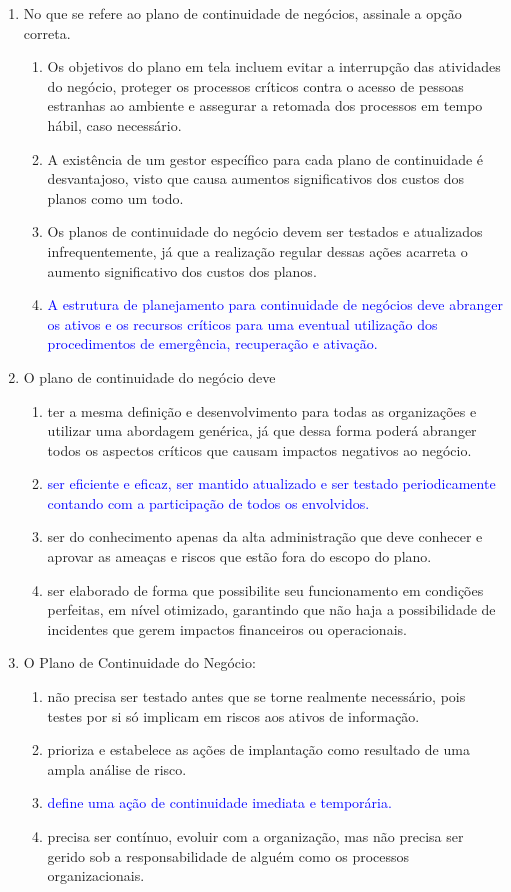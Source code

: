 \documentclass{report}
\begin{document}
\begin{enumerate}
		\item No que se refere ao plano de continuidade de negócios, assinale a opção correta.
		\begin{enumerate}[label=(\alph*)]
			\item Os objetivos do plano em tela incluem evitar a interrupção das atividades do negócio, proteger os processos críticos contra o acesso de pessoas estranhas ao ambiente e assegurar a retomada dos processos em tempo hábil, caso necessário.
			\item A existência de um gestor específico para cada plano de continuidade é desvantajoso, visto que causa aumentos significativos dos custos dos planos como um todo.
			\item Os planos de continuidade do negócio devem ser testados e atualizados infrequentemente, já que a realização regular dessas ações acarreta o aumento significativo dos custos dos planos.
			\item \textcolor{blue}{A estrutura de planejamento para continuidade de negócios deve abranger os ativos e os recursos críticos para uma eventual utilização dos procedimentos de emergência, recuperação e ativação.}
		\end{enumerate}
		
		\item O plano de continuidade do negócio deve
		\begin{enumerate}[label=(\alph*)]
			\item ter a mesma definição e desenvolvimento para todas as organizações e utilizar uma abordagem genérica, já que dessa forma poderá abranger todos os aspectos críticos que causam impactos negativos ao negócio.
			\item \textcolor{blue}{ser eficiente e eficaz, ser mantido atualizado e ser testado periodicamente contando com a participação de todos os envolvidos.}
			\item ser do conhecimento apenas da alta administração que deve conhecer e aprovar as ameaças e riscos que estão fora do escopo do plano.
			\item ser elaborado de forma que possibilite seu funcionamento em condições perfeitas, em nível otimizado, garantindo que não haja a possibilidade de incidentes que gerem impactos financeiros ou operacionais.
		\end{enumerate}
		
		\item O Plano de Continuidade do Negócio:
		\begin{enumerate}[label=(\alph*)]
			\item não precisa ser testado antes que se torne realmente necessário, pois testes por si só implicam em riscos aos ativos de informação.
			\item prioriza e estabelece as ações de implantação como resultado de uma ampla análise de risco.
			\item \textcolor{blue}{define uma ação de continuidade imediata e temporária.}
			\item precisa ser contínuo, evoluir com a organização, mas não precisa ser gerido sob a responsabilidade de alguém como os processos organizacionais.
		\end{enumerate}
		

\end{enumerate}
\end{document}
